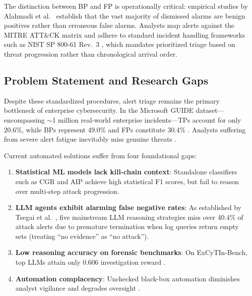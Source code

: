 The distinction between BP and FP is operationally critical: empirical studies by Alahmadi et al.\ \cite{alahmadi2022falsepositives} establish that the vast majority of dismissed alarms are benign positives rather than erroneous false alarms. Analysts map alerts against the MITRE ATT\&CK matrix \cite{sadlek2025killchain} and adhere to standard incident handling frameworks such as NIST SP 800-61 Rev.~3 \cite{nist2025sp80061r3}, which mandates prioritized triage based on threat progression rather than chronological arrival order.

\subsection{Problem Statement and Research Gaps}
Despite these standardized procedures, alert triage remains the primary bottleneck of enterprise cybersecurity. In the Microsoft GUIDE dataset---encompassing $\sim$1 million real-world enterprise incidents---TPs account for only 20.6\%, while BPs represent 49.0\% and FPs constitute 30.4\% \cite{freitas2024cgr}. Analysts suffering from severe alert fatigue inevitably miss genuine threats \cite{ndichu2026survey}. 

Current automated solutions suffer from four foundational gaps:
\begin{enumerate}
    \item \textbf{Statistical ML models lack kill-chain context}: Standalone classifiers such as CGR \cite{freitas2024cgr} and AIP \cite{freitas2026aip} achieve high statistical F1 scores, but fail to reason over multi-step attack progression.
    \item \textbf{LLM agents exhibit alarming false negative rates}: As established by Tsegai et al.\ \cite{tsegai2026aida}, five mainstream LLM reasoning strategies miss over 40.4\% of attack alerts due to premature termination when log queries return empty sets (treating ``no evidence'' as ``no attack'').
    \item \textbf{Low reasoning accuracy on forensic benchmarks}: On ExCyTIn-Bench, top LLMs attain only 0.606 investigation reward \cite{wu2026excytin}.
    \item \textbf{Automation complacency}: Unchecked black-box automation diminishes analyst vigilance and degrades oversight \cite{tilbury2026vigilance}.
\end{enumerate}

